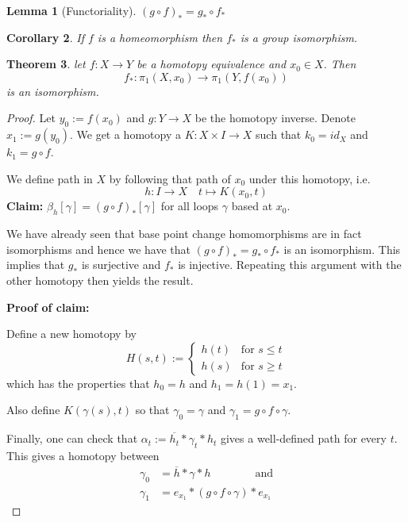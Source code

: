 \documentclass[11pt]{article}
\newcommand{\defeq}{:=}
\newtheorem{theorem}{Theorem}[section]
\newtheorem{cor}[theorem]{Corollary}
\newtheorem{lemma}[theorem]{Lemma}
\begin{document}
\begin{lemma}[Functoriality]
$(g\circ f)_\ast = g_\ast \circ f_\ast$
\end{lemma}
\begin{cor}
If $f$ is a homeomorphism then $f_\ast$ is a group isomorphism.
\end{cor}
\begin{theorem}
let $f:X\to Y$ be a homotopy equivalence and $x_0\in X$.
Then $$f_\ast:\pi_1(X, x_0)\to\pi_1(Y, f(x_0))$$ is an isomorphism.
\end{theorem}

\begin{proof}
Let $y_0\defeq f(x_0)$ and $g:Y\to X$ be the homotopy inverse.
Denote $x_1\defeq g(y_0)$.
We get a homotopy a $K:X\times I \to X$ such that $k_0=id_X$ and $k_1=g\circ f$.

We define path in $X$ by following that path of $x_0$ under this homotopy, i.e.
\[
	h:I\to X\quad t\mapsto K(x_0, t)
\]
\textbf{Claim: }$\beta_h[\gamma]=(g\circ f)_\ast [\gamma]$ for all loops $\gamma$ based at $x_0$.

We have already seen that base point change homomorphisms are in fact isomorphisms and hence we have that $(g\circ f)_\ast = g_\ast \circ f_\ast$ is an isomorphism.
This implies that $g_\ast$ is surjective and $f_\ast$ is injective.
Repeating this argument with the other homotopy then yields the result.

\textbf{Proof of claim:}

Define a new homotopy by
\[
	H(s, t)\defeq
	\begin{cases}
		h(t) & \text{for } s\leq t \\
		h(s) & \text{for } s\geq t
	\end{cases}
\]
which has the properties that $h_0=h$ and $h_1=h(1)=x_1$.

Also define $K(\gamma(s), t)$ so that $\gamma_0=\gamma$ and $\gamma_1 = g\circ f \circ \gamma$.

Finally, one can check that $\alpha_t\defeq \overline{h_t}\ast \gamma_t\ast h_t$ gives a well-defined path for every $t$.
This gives a homotopy between
\begin{align*}
	\gamma_0&=\overline{h}\ast\gamma\ast h \quad\quad\quad\quad \text{and} \\
	\gamma_1&=e_{x_1}\ast(g\circ f\circ \gamma)\ast e_{x_1}
\end{align*}
\end{proof}
\end{document}
